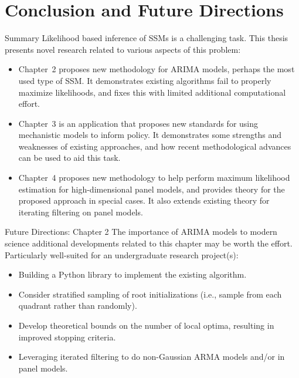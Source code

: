 \documentclass[aspectratio=169]{beamer}\usepackage[]{graphicx}\usepackage[]{xcolor}
\begin{document}
\section{Conclusion and Future Directions}

  \begin{frame}{Summary}
    Likelihood based inference of SSMs is a challenging task. This thesis presents novel research related to various aspects of this problem:
    \begin{itemize}
      \item Chapter~2 proposes new \alert{methodology} for ARIMA models, perhaps the most used type of SSM. It demonstrates existing algorithms fail to properly maximize likelihoods, and fixes this with limited additional computational effort. 
      \item Chapter~3 is an \alert{application} that proposes new standards for using mechanistic models to inform policy. It demonstrates some strengths and weaknesses of existing approaches, and how recent methodological advances can be used to aid this task. 
      \item Chapter~4 proposes new \alert{methodology} to help perform maximum likelihood estimation for high-dimensional panel models, and provides \alert{theory} for the proposed approach in special cases. It also extends existing theory for iterating filtering on panel models.
    \end{itemize}
  \end{frame}

  \begin{frame}{Future Directions: Chapter 2}
    The importance of ARIMA models to modern science additional developments related to this chapter may be worth the effort. Particularly well-suited for an undergraduate research project(s): 
    \begin{itemize}
      \item Building a Python library to implement the existing algorithm. 
      \item Consider stratified sampling of root initializations (i.e., sample from each quadrant rather than randomly).
      \item Develop theoretical bounds on the number of local optima, resulting in improved stopping criteria.
      \item Leveraging iterated filtering to do non-Gaussian ARMA models and/or in panel models.
    \end{itemize}
  \end{frame}
  
\end{document}
